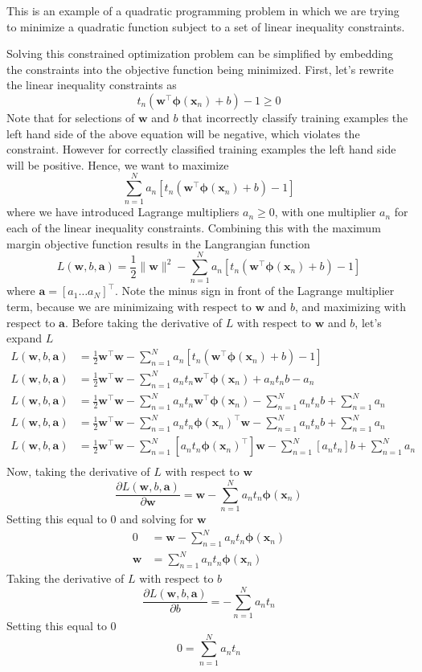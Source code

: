 \documentclass[12pt]{article}
\newcommand{\lp}{\left(}
\newcommand{\rp}{\right)}
\newcommand{\lb}{\left[}
\newcommand{\rb}{\right]}
\newcommand{\x}{\mathbf{x}}
\newcommand{\w}{\mathbf{w}}
\newcommand{\aVec}{\mathbf{a}}
\newcommand{\sumN}{\sum \limits_{n=1}^N}
\newcommand{\phiOfXn}{\mathbf{\phi}\left(\x_n\right)}
\newcommand{\wTPhiOfXn}{\w^\top\phiOfXn}
\newcommand{\phiOfXnTw}{\phiOfXn^\top\w}
\newcommand{\LFunc}{L\lp\w,b,\aVec\rp}
\newcommand{\dLdw}{\frac{\partial \LFunc}{\partial \w}}
\newcommand{\dLdb}{\frac{\partial \LFunc}{\partial b}}
\begin{document}
This is an example of a quadratic programming problem in which we are trying to
minimize a quadratic function subject to a set of linear inequality constraints.

Solving this constrained optimization problem can be simplified by embedding the
constraints into the objective function being minimized. First, let's rewrite
the linear inequality constraints as
%
\begin{equation*}
  t_n\lp\wTPhiOfXn + b\rp - 1 \ge 0
\end{equation*}
%
Note that for selections of $\w$ and $b$ that incorrectly classify training
examples the left hand side of the above equation will be negative, which
violates the constraint. However for correctly classified training examples
the left hand side will be positive. Hence, we want to maximize
%
\begin{equation*}
  \sumN a_n \lb t_n\lp\wTPhiOfXn + b\rp - 1 \rb
\end{equation*}
%
where we have introduced Lagrange multipliers $a_n \ge 0$, with one multiplier
$a_n$ for each of the linear inequality constraints. Combining this with the
maximum margin objective function results in the Langrangian function
%
\begin{equation*}
  \LFunc = \frac{1}{2}\|\w\|^2 - \sumN a_n \lb t_n\lp\wTPhiOfXn + b\rp - 1 \rb
\end{equation*}
%
where $\aVec = \lb a_1 \hdots a_N \rb^\top$. Note the minus sign in front of the
Lagrange multiplier term, because we are minimizaing with respect to $\w$ and
$b$, and maximizing with respect to $\aVec$. Before taking the derivative of
$L$ with respect to $\w$ and $b$, let's expand $L$
%
\begin{align*}
  \LFunc &= \frac{1}{2}\w^\top\w - \sumN a_n \lb t_n\lp\wTPhiOfXn + b\rp - 1 \rb \\
  \LFunc &= \frac{1}{2}\w^\top\w - \sumN a_nt_n\wTPhiOfXn + a_nt_nb - a_n \\
  \LFunc &= \frac{1}{2}\w^\top\w - \sumN a_nt_n\wTPhiOfXn - \sumN a_nt_nb + \sumN a_n \\
  \LFunc &= \frac{1}{2}\w^\top\w - \sumN a_nt_n\phiOfXnTw - \sumN a_nt_nb + \sumN a_n \\
  \LFunc &= \frac{1}{2}\w^\top\w - \sumN \lb a_nt_n\phiOfXn^\top \rb \w - \sumN \lb a_nt_n \rb b + \sumN a_n \\
\end{align*}
%
Now, taking the derivative of $L$ with respect to $\w$
%
\begin{equation*}
  \dLdw = \w - \sumN a_nt_n\phiOfXn
\end{equation*}
%
Setting this equal to 0 and solving for $\w$
%
\begin{align*}
  0 &= \w - \sumN a_nt_n\phiOfXn \\
  \w &= \sumN a_nt_n\phiOfXn
\end{align*}
%
Taking the derivative of $L$ with respect to $b$
%
\begin{equation*}
  \dLdb = - \sumN a_nt_n
\end{equation*}
%
Setting this equal to 0
%
\begin{equation*}
  0 = \sumN a_nt_n
\end{equation*}
%
\end{document}
